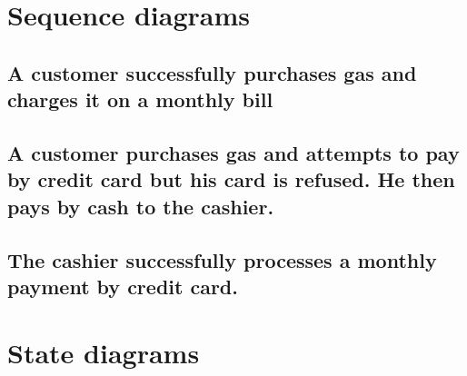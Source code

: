 \documentclass[11pt, a4paper]{article}
\begin{document}
\section{Sequence diagrams}
\subsection{A customer successfully purchases gas and charges it on
a monthly bill}
\subsection{A customer purchases gas and attempts to pay by credit
card but his card is refused. He then pays by cash to the cashier.}
\subsection{The cashier successfully processes a monthly payment by
credit card.}
\section{State diagrams}
\end{document}
